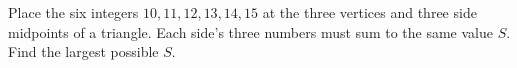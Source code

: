 Place the six integers $10,11,12,13,14,15$ at the three vertices and three side midpoints of a triangle. Each side's three numbers must sum to the same value $S$. Find the largest possible $S$.

